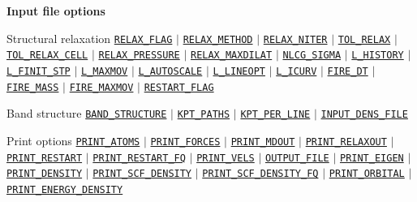 \begin{frame}[allowframebreaks]{\textbf{Input file options}}
  \vspace{-2mm}
  \begin{block}{Structural relaxation}
  \hyperlink{RELAX_FLAG}{\texttt{RELAX\_FLAG}} $\vert$
  \hyperlink{RELAX_METHOD}{\texttt{RELAX\_METHOD}} $\vert$
  \hyperlink{RELAX_NITER}{\texttt{RELAX\_NITER}} $\vert$
  \hyperlink{TOL_RELAX}{\texttt{TOL\_RELAX}} $\vert$
  \hyperlink{TOL_RELAX_CELL}{\texttt{TOL\_RELAX\_CELL}} $\vert$ \hyperlink{RELAX_PRESSURE}{\texttt{RELAX\_PRESSURE}} $\vert$
  \hyperlink{RELAX_MAXDILAT}{\texttt{RELAX\_MAXDILAT}} $\vert$
  \hyperlink{NLCG_SIGMA}{\texttt{NLCG\_SIGMA}} $\vert$
  \hyperlink{L_HISTORY}{\texttt{L\_HISTORY}} $\vert$
  \hyperlink{L_FINIT_STP}{\texttt{L\_FINIT\_STP}} $\vert$
  \hyperlink{L_MAXMOV}{\texttt{L\_MAXMOV}} $\vert$
  \hyperlink{L_AUTOSCALE}{\texttt{L\_AUTOSCALE}} $\vert$
  \hyperlink{L_LINEOPT}{\texttt{L\_LINEOPT}} $\vert$
  \hyperlink{L_ICURV}{\texttt{L\_ICURV}} $\vert$
  \hyperlink{FIRE_DT}{\texttt{FIRE\_DT}} $\vert$
  \hyperlink{FIRE_MASS}{\texttt{FIRE\_MASS}} $\vert$
  \hyperlink{FIRE_MAXMOV}{\texttt{FIRE\_MAXMOV}} $\vert$
  \hyperlink{RESTART_FLAG}{\texttt{RESTART\_FLAG}}
  \end{block}

  \vspace{-2mm}
  \begin{block}{Band structure}
  \hyperlink{BAND_STRUCTURE}{\texttt{BAND\_STRUCTURE}} $\vert$
  \hyperlink{KPT_PATHS}{\texttt{KPT\_PATHS}} $\vert$
  \hyperlink{KPT_PER_LINE}{\texttt{KPT\_PER\_LINE}} $\vert$
  \hyperlink{INPUT_DENS_FILE}{\texttt{INPUT\_DENS\_FILE}}
  \end{block}
  
  \begin{block}{Print options}
  \hyperlink{PRINT_ATOMS}{\texttt{PRINT\_ATOMS}} $\vert$
  \hyperlink{PRINT_FORCES}{\texttt{PRINT\_FORCES}} $\vert$
  \hyperlink{PRINT_MDOUT}{\texttt{PRINT\_MDOUT}} $\vert$
  \hyperlink{PRINT_RELAXOUT}{\texttt{PRINT\_RELAXOUT}} $\vert$
  \hyperlink{PRINT_RESTART}{\texttt{PRINT\_RESTART}} $\vert$
  \hyperlink{PRINT_RESTART_FQ}{\texttt{PRINT\_RESTART\_FQ}} $\vert$
  \hyperlink{PRINT_VELS}{\texttt{PRINT\_VELS}} $\vert$
  \hyperlink{OUTPUT_FILE}{\texttt{OUTPUT\_FILE}} $\vert$
  \hyperlink{PRINT_EIGEN}{\texttt{PRINT\_EIGEN}} $\vert$
  \hyperlink{PRINT_DENSITY}{\texttt{PRINT\_DENSITY}} $\vert$
  \hyperlink{PRINT_SCF_DENSITY}{\texttt{PRINT\_SCF\_DENSITY}} $\vert$
  \hyperlink{PRINT_SCF_DENSITY_FQ}{\texttt{PRINT\_SCF\_DENSITY\_FQ}} $\vert$
  \hyperlink{PRINT_ORBITAL}{\texttt{PRINT\_ORBITAL}} $\vert$
  \hyperlink{PRINT_ENERGY_DENSITY}{\texttt{PRINT\_ENERGY\_DENSITY}}
  \end{block}
  

\end{frame}
